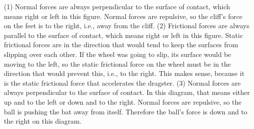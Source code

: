 (1) Normal forces are always perpendicular to the surface of contact,
 which means right or left in this figure. Normal
forces are repulsive, so the cliff's force on the feet
 is to the right, i.e., away from the cliff.  (2) Frictional forces are
always parallel to the surface of contact, which means right or left
 in this figure. Static frictional forces are in the
direction that would tend to keep the surfaces from slipping over
 each other. If the wheel was going to slip, its
surface would be moving to the left, so the static frictional force on
 the wheel must be in the direction that would
prevent this, i.e., to the right. This makes sense, because it is
 the static frictional force that accelerates the
dragster.  (3) Normal forces are always perpendicular to the surface of
 contact. In this diagram, that means either
up and to the left or down and to the right. Normal forces are 
repulsive, so the ball is pushing the bat away from
itself. Therefore the ball's force is down and to the right on this diagram.



